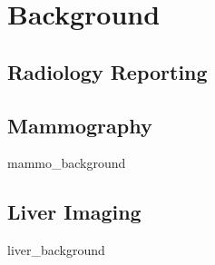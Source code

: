 \chapter{Background}

\section{Radiology Reporting}

\section{Mammography}
{mammo_background}

\section{Liver Imaging}
{liver_background}

